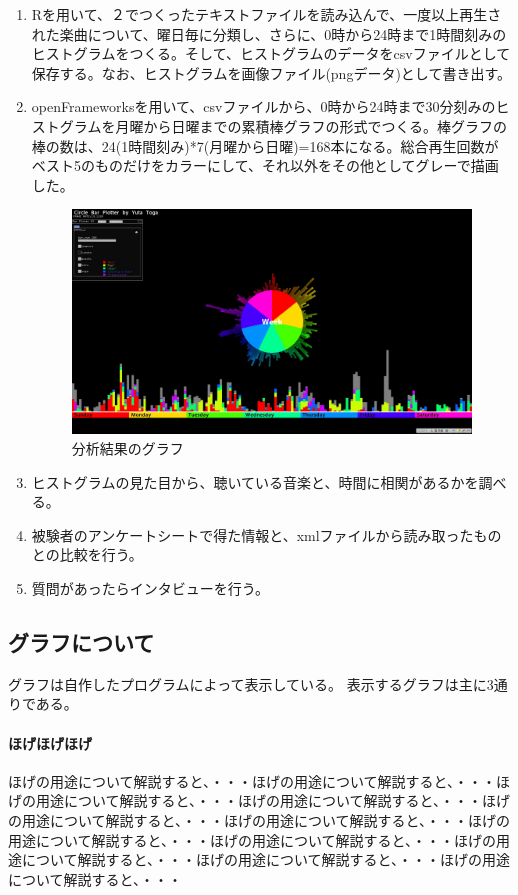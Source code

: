\documentclass{jsarticle}
\begin{document}
\begin{enumerate}
\item
Rを用いて、２でつくったテキストファイルを読み込んで、一度以上再生された楽曲について、曜日毎に分類し、さらに、0時から24時まで1時間刻みのヒストグラムをつくる。そして、ヒストグラムのデータをcsvファイルとして保存する。なお、ヒストグラムを画像ファイル(pngデータ)として書き出す。

\item
openFrameworksを用いて、csvファイルから、0時から24時まで30分刻みのヒストグラムを月曜から日曜までの累積棒グラフの形式でつくる。棒グラフの棒の数は、24(1時間刻み)*7(月曜から日曜)=168本になる。総合再生回数がベスト5のものだけをカラーにして、それ以外をその他としてグレーで描画した。

\begin{figure}
\begin{center}
\includegraphics[width=14cm]{graph_sample.jpg}
\caption{分析結果のグラフ}
\end{center}
\end{figure}

\item
ヒストグラムの見た目から、聴いている音楽と、時間に相関があるかを調べる。
\item
被験者のアンケートシートで得た情報と、xmlファイルから読み取ったものとの比較を行う。
\item
質問があったらインタビューを行う。

\end{enumerate}
\subsection{グラフについて}
グラフは自作したプログラムによって表示している。
表示するグラフは主に3通りである。

\paragraph{ほげほげほげ} ほげの用途について解説すると、・・・ほげの用途について解説すると、・・・ほげの用途について解説すると、・・・ほげの用途について解説すると、・・・ほげの用途について解説すると、・・・ほげの用途について解説すると、・・・ほげの用途について解説すると、・・・ほげの用途について解説すると、・・・ほげの用途について解説すると、・・・ほげの用途について解説すると、・・・ほげの用途について解説すると、・・・
\end{document}
